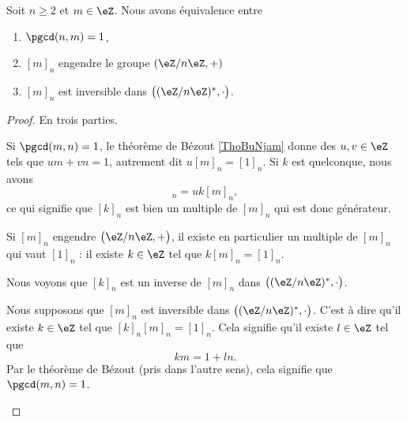 \begin{proposition}       \label{PROPooMTWGooEMbvDi}
	Soit \( n\geq 2\) et \( m\in \eZ\). Nous avons équivalence entre
	\begin{enumerate}
		\item	\label{ITEMooMCIJooItgSHc}
		      \( \pgcd(n,m)=1\),
		\item		\label{ITEMooMNKCooPnpyye}
		      \( [m]_n\) engendre le groupe \( (\eZ/n\eZ,+)\)
		\item		\label{ITEMooBPWLooFLdJfr}
		      \( [m]_n\) est inversible dans \( \big( (\eZ/n\eZ)^*,\cdot \big)\).
	\end{enumerate}
\end{proposition}

\begin{proof}
	En trois parties.
	\begin{subproof}

		Si \( \pgcd(m,n)=1\), le théorème de Bézout \ref{ThoBuNjam} donne des \( u,v\in \eZ\) tels que \( um+vn=1\), autrement dit \( u[m]_n=[1]_n\). Si \( k\) est quelconque, nous avons
		\begin{equation}
			[k]_n=uk[m]_n,
		\end{equation}
		ce qui signifie que \( [k]_n\) est bien un multiple de \( [m]_n\) qui est donc générateur.


		Si \( [m]_n\) engendre \( \big( \eZ/n\eZ,+ \big)\), il existe en particulier un multiple de \( [m]_n\) qui vaut \( [1]_n\) : il existe \( k\in \eZ\) tel que \( k[m]_n=[1]_n\).

		Nous voyons que \( [k]_n\) est un inverse de \( [m]_n\) dans \( \big( (\eZ/n\eZ)^*,\cdot \big)\).


		Nous supposons que \( [m]_n\) est inversible dans \( \big( (\eZ/n\eZ)^*,\cdot \big)\). C'est à dire qu'il existe \( k\in \eZ\) tel que \( [k]_n[m]_n=[1]_n\). Cela signifie qu'il existe \( l\in \eZ\) tel que
		\begin{equation}
			km=1+ln.
		\end{equation}
		Par le théorème de Bézout (pris dans l'autre sens), cela signifie que \( \pgcd(m,n)=1\).

	\end{subproof}
\end{proof}

